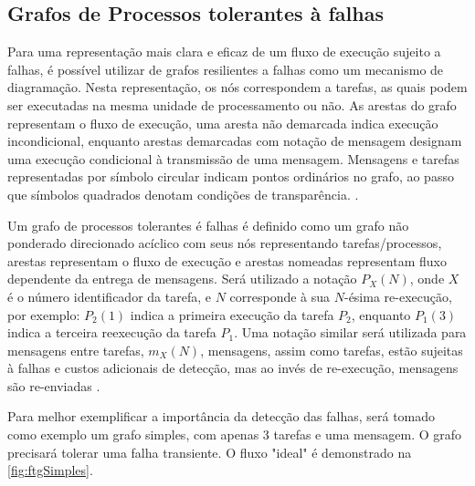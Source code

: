 \subsection{Grafos de Processos tolerantes à falhas}

Para uma representação mais clara e eficaz de um fluxo de execução sujeito a falhas, é possível utilizar de grafos resilientes a falhas como um mecanismo de diagramação. Nesta representação, os nós correspondem a tarefas, as quais podem ser executadas na mesma unidade de processamento ou não. As arestas do grafo representam o fluxo de execução, uma aresta não demarcada indica execução incondicional, enquanto arestas demarcadas com notação de mensagem designam uma execução condicional à transmissão de uma mensagem. Mensagens e tarefas representadas por símbolo circular indicam pontos ordinários no grafo, ao passo que símbolos quadrados denotam condições de transparência. \cite{SchedAndOptOfDistributedFT}.

Um grafo de processos tolerantes é falhas é definido como um grafo não ponderado direcionado acíclico com seus nós representando tarefas/processos, arestas representam o fluxo de execução e arestas nomeadas representam fluxo dependente da entrega de mensagens. Será utilizado a notação $P_X (N)$, onde $X$ é o número identificador da tarefa, e $N$ corresponde à sua $N$-ésima re-execução, por exemplo: $P_2 (1)$ indica a primeira execução da tarefa $P_2$, enquanto $P_1 (3)$ indica a terceira reexecução da tarefa $P_1$. Uma notação similar será utilizada para mensagens entre tarefas, $m_X (N)$, mensagens, assim como tarefas, estão sujeitas à falhas e custos adicionais de detecção, mas ao invés de re-execução, mensagens são re-enviadas \cite{SchedFTWithSoftAndHardConstraints}.

Para melhor exemplificar a importância da detecção das falhas, será tomado como exemplo um grafo simples, com apenas 3 tarefas e uma mensagem. O grafo precisará tolerar uma falha transiente. O fluxo "ideal" é demonstrado na \autoref{fig:ftgSimples}.


